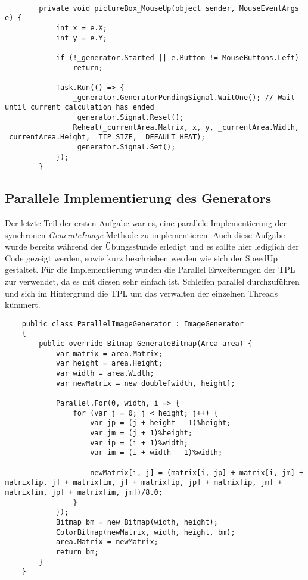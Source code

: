 \documentclass[a4paper,ngerman]{scrartcl}
\begin{document}
\begin{lstlisting}

        private void pictureBox_MouseUp(object sender, MouseEventArgs e) {
            int x = e.X;
            int y = e.Y;

            if (!_generator.Started || e.Button != MouseButtons.Left)
                return;

            Task.Run(() => {
                _generator.GeneratorPendingSignal.WaitOne(); // Wait until current calculation has ended
                _generator.Signal.Reset();
                Reheat(_currentArea.Matrix, x, y, _currentArea.Width, _currentArea.Height, _TIP_SIZE, _DEFAULT_HEAT);
                _generator.Signal.Set();
            });
        }
\end{lstlisting}

\subsection{Parallele Implementierung des Generators}

Der letzte Teil der ersten Aufgabe war es, eine parallele Implementierung der synchronen \textit{GenerateImage} Methode zu implementieren. Auch diese Aufgabe wurde bereits während der Übungsstunde erledigt und es sollte hier lediglich der Code gezeigt werden, sowie kurz beschrieben werden wie sich der SpeedUp gestaltet.  Für die Implementierung wurden die Parallel Erweiterungen der TPL zur verwendet, da es mit diesen sehr einfach ist, Schleifen parallel durchzuführen und sich im Hintergrund die TPL um das verwalten der einzelnen Threads kümmert.

\begin{lstlisting}
    public class ParallelImageGenerator : ImageGenerator
    {
        public override Bitmap GenerateBitmap(Area area) {
            var matrix = area.Matrix;
            var height = area.Height;
            var width = area.Width;
            var newMatrix = new double[width, height];

            Parallel.For(0, width, i => {
                for (var j = 0; j < height; j++) {
                    var jp = (j + height - 1)%height;
                    var jm = (j + 1)%height;
                    var ip = (i + 1)%width;
                    var im = (i + width - 1)%width;

                    newMatrix[i, j] = (matrix[i, jp] + matrix[i, jm] + matrix[ip, j] + matrix[im, j] + matrix[ip, jp] + matrix[ip, jm] + matrix[im, jp] + matrix[im, jm])/8.0;
                }
            });
            Bitmap bm = new Bitmap(width, height);
            ColorBitmap(newMatrix, width, height, bm);
            area.Matrix = newMatrix;
            return bm;
        }
    }
\end{lstlisting}
\end{document}
